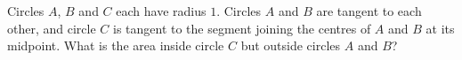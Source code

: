 Circles $A$, $B$ and $C$ each have radius $1$. Circles $A$ and $B$ are tangent to each other, and circle $C$ is tangent to the segment joining the centres of $A$ and $B$ at its midpoint. What is the area inside circle $C$ but outside circles $A$ and $B$?
